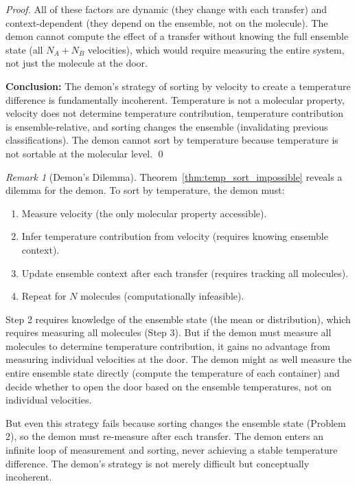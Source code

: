 \documentclass[12pt,a4paper]{article}
\theoremstyle{definition}
\theoremstyle{remark}
\newtheorem{remark}[theorem]{Remark}
\begin{document}
\begin{proof}
All of these factors are dynamic (they change with each transfer) and context-dependent (they depend on the ensemble, not on the molecule). The demon cannot compute the effect of a transfer without knowing the full ensemble state (all $N_A + N_B$ velocities), which would require measuring the entire system, not just the molecule at the door.

\textbf{Conclusion:}
The demon's strategy of sorting by velocity to create a temperature difference is fundamentally incoherent. Temperature is not a molecular property, velocity does not determine temperature contribution, temperature contribution is ensemble-relative, and sorting changes the ensemble (invalidating previous classifications). The demon cannot sort by temperature because temperature is not sortable at the molecular level. \qed
\end{proof}

\begin{remark}[Demon's Dilemma]
\label{rem:demon_dilemma}
Theorem~\ref{thm:temp_sort_impossible} reveals a dilemma for the demon. To sort by temperature, the demon must:
\begin{enumerate}
    \item Measure velocity (the only molecular property accessible).
    \item Infer temperature contribution from velocity (requires knowing ensemble context).
    \item Update ensemble context after each transfer (requires tracking all molecules).
    \item Repeat for $N$ molecules (computationally infeasible).
\end{enumerate}

Step 2 requires knowledge of the ensemble state (the mean or distribution), which requires measuring all molecules (Step 3). But if the demon must measure all molecules to determine temperature contribution, it gains no advantage from measuring individual velocities at the door. The demon might as well measure the entire ensemble state directly (compute the temperature of each container) and decide whether to open the door based on the ensemble temperatures, not on individual velocities.

But even this strategy fails because sorting changes the ensemble state (Problem 2), so the demon must re-measure after each transfer. The demon enters an infinite loop of measurement and sorting, never achieving a stable temperature difference. The demon's strategy is not merely difficult but conceptually incoherent.
\end{remark}
\end{document}
